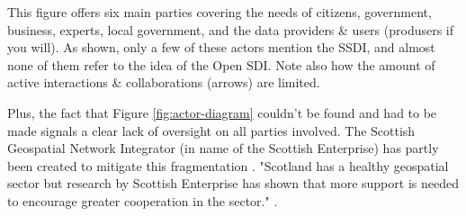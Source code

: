 This figure offers six main parties covering the needs of citizens, government, business, experts, local government, and the data providers \& users (produsers if you will). As shown, only a few of these actors mention the SSDI, and almost none of them refer to the idea of the Open SDI. Note also how the amount of active interactions \& collaborations (arrows) are limited. 

Plus, the fact that Figure \ref{fig:actor-diagram} couldn't be found and had to be made signals a clear lack of oversight on all parties involved. The Scottish Geospatial Network Integrator (in name of the Scottish Enterprise) has partly been created to mitigate this fragmentation \citep{scottish_geospatial_network_integrator}. "Scotland has a healthy geospatial sector but research by Scottish Enterprise has shown that more support is needed to encourage greater cooperation in the sector." \citep{scottish_geospatial_network_integrator}.